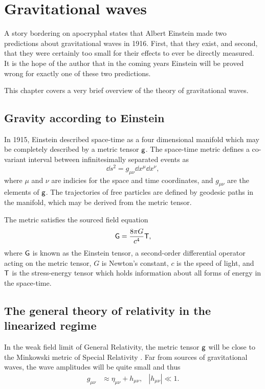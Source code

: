 \chapter{Gravitational waves}
\label{ch:gws}
A story bordering on apocryphal states that Albert Einstein made two predictions about gravitational waves in 1916. %
First, that they exist, and second, that they were certainly too small for their effects to ever be directly measured. %
It is the hope of the author that in the coming years Einstein will be proved wrong for exactly one of these two predictions.

This chapter covers a very brief overview of the theory of gravitational waves. %


\section{Gravity according to Einstein}
In 1915, Einstein described space-time as a four dimensional manifold which may be completely described by a metric tensor $\mathsf{g}$. %
The space-time metric defines a co-variant interval between infinitesimally separated events as
\begin{equation}
\dd s^2 = g_{\mu \nu}\dd x^\mu \dd x^\nu,
\end{equation}
where $\mu$ and $\nu$ are indicies for the space and time coordinates, and $g_{\mu \nu}$ are the elements of $\mathsf{g}$. %
The trajectories of free particles are defined by geodesic paths in the manifold, which may be derived from the metric tensor\cite[Chap. %
3]{carroll2004spacetime}.

The metric satisfies the sourced field equation
\begin{equation}
\label{eqn:einstein}
\mathsf{G}=\frac{8\pi G}{c^4}\mathsf{T},
\end{equation}
where $\mathsf{G}$ is known as the Einstein tensor, a second-order differential operator acting on the metric tensor, $G$ is Newton's constant, $c$ is the speed of light, and $\mathsf{T}$ is the stress-energy tensor which holds information about all forms of energy in the space-time.

\section{The general theory of relativity in the linearized regime}
In the weak field limit of General Relativity, the metric tensor $\mathsf{g}$ will be close to the Minkowski metric of Special Relativity \cite[Chap. %
7]{carroll2004spacetime}. %
Far from sources of gravitational waves, the wave amplitudes will be quite small and thus
\begin{align}
g_{\mu \nu}&\approx \eta_{\mu \nu}+h_{\mu \nu}, &|h_{\mu \nu}|\ll 1.
\end{align}

